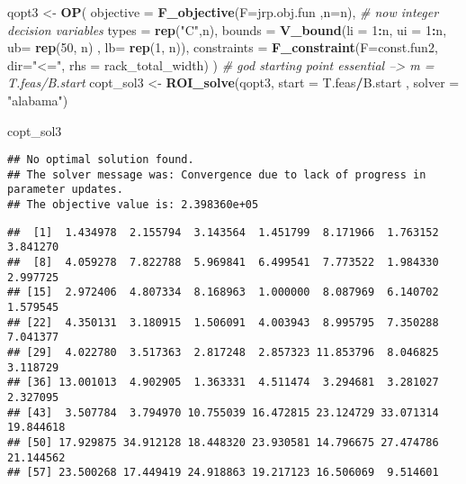 \documentclass[
]{article}
\newenvironment{Shaded}{\begin{snugshade}}{\end{snugshade}}
\newcommand{\CommentTok}[1]{\textcolor[rgb]{0.56,0.35,0.01}{\textit{#1}}}
\newcommand{\DataTypeTok}[1]{\textcolor[rgb]{0.13,0.29,0.53}{#1}}
\newcommand{\DecValTok}[1]{\textcolor[rgb]{0.00,0.00,0.81}{#1}}
\newcommand{\KeywordTok}[1]{\textcolor[rgb]{0.13,0.29,0.53}{\textbf{#1}}}
\newcommand{\NormalTok}[1]{#1}
\newcommand{\OperatorTok}[1]{\textcolor[rgb]{0.81,0.36,0.00}{\textbf{#1}}}
\newcommand{\StringTok}[1]{\textcolor[rgb]{0.31,0.60,0.02}{#1}}
\begin{document}
\begin{Shaded}
\begin{Highlighting}[]
\NormalTok{qopt3 <-}\StringTok{ }\KeywordTok{OP}\NormalTok{(}
  \DataTypeTok{objective =} \KeywordTok{F_objective}\NormalTok{(}\DataTypeTok{F=}\NormalTok{jrp.obj.fun ,}\DataTypeTok{n=}\NormalTok{n),}
  \CommentTok{# now integer decision variables}
  \DataTypeTok{types =} \KeywordTok{rep}\NormalTok{(}\StringTok{"C"}\NormalTok{,n),}
  \DataTypeTok{bounds =} \KeywordTok{V_bound}\NormalTok{(}\DataTypeTok{li =} \DecValTok{1}\OperatorTok{:}\NormalTok{n, }\DataTypeTok{ui =} \DecValTok{1}\OperatorTok{:}\NormalTok{n, }\DataTypeTok{ub=} \KeywordTok{rep}\NormalTok{(}\DecValTok{50}\NormalTok{, n) , }\DataTypeTok{lb=} \KeywordTok{rep}\NormalTok{(}\DecValTok{1}\NormalTok{, n)),}
  \DataTypeTok{constraints =} \KeywordTok{F_constraint}\NormalTok{(}\DataTypeTok{F=}\NormalTok{const.fun2,}
                             \DataTypeTok{dir=}\StringTok{"<="}\NormalTok{,}
                             \DataTypeTok{rhs =}\NormalTok{ rack_total_width)}
\NormalTok{)}
\CommentTok{# god starting point essential --> m = T.feas/B.start}
\NormalTok{copt_sol3 <-}\StringTok{ }\KeywordTok{ROI_solve}\NormalTok{(qopt3, }\DataTypeTok{start =}\NormalTok{ T.feas}\OperatorTok{/}\NormalTok{B.start , }\DataTypeTok{solver =} \StringTok{"alabama"}\NormalTok{)}

\NormalTok{copt_sol3}
\end{Highlighting}
\end{Shaded}

\begin{verbatim}
## No optimal solution found.
## The solver message was: Convergence due to lack of progress in parameter updates.
## The objective value is: 2.398360e+05
\end{verbatim}

\begin{Shaded}
\end{Shaded}

\begin{verbatim}
##  [1]  1.434978  2.155794  3.143564  1.451799  8.171966  1.763152  3.841270
##  [8]  4.059278  7.822788  5.969841  6.499541  7.773522  1.984330  2.997725
## [15]  2.972406  4.807334  8.168963  1.000000  8.087969  6.140702  1.579545
## [22]  4.350131  3.180915  1.506091  4.003943  8.995795  7.350288  7.041377
## [29]  4.022780  3.517363  2.817248  2.857323 11.853796  8.046825  3.118729
## [36] 13.001013  4.902905  1.363331  4.511474  3.294681  3.281027  2.327095
## [43]  3.507784  3.794970 10.755039 16.472815 23.124729 33.071314 19.844618
## [50] 17.929875 34.912128 18.448320 23.930581 14.796675 27.474786 21.144562
## [57] 23.500268 17.449419 24.918863 19.217123 16.506069  9.514601
\end{verbatim}
\end{document}

